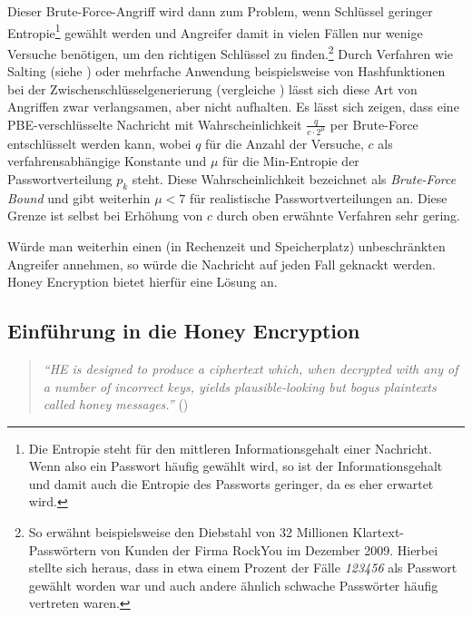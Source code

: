 Dieser Brute-Force-Angriff wird dann zum Problem, wenn Schlüssel geringer Entropie\footnote{Die Entropie steht für den mittleren Informationsgehalt einer Nachricht. Wenn also ein Passwort häufig gewählt wird, so ist der Informationsgehalt und damit auch die Entropie des Passworts geringer, da es eher erwartet wird.} gewählt werden und Angreifer damit in vielen Fällen nur wenige Versuche benötigen, um den richtigen Schlüssel zu finden.\footnote{So erwähnt \cite{IEEE2014} beispielsweise den Diebstahl von 32 Millionen Klartext-Passwörtern von Kunden der Firma RockYou im Dezember 2009. Hierbei stellte sich heraus, dass in etwa einem Prozent der Fälle \emph{123456} als Passwort gewählt worden war und auch andere ähnlich schwache Passwörter häufig vertreten waren.} Durch Verfahren wie Salting (siehe \cite{Schneier2006}) oder mehrfache Anwendung beispielsweise von Hashfunktionen bei der Zwischenschlüsselgenerierung (vergleiche \cite{pbkdf2000}) lässt sich diese Art von Angriffen zwar verlangsamen, aber nicht aufhalten. Es lässt sich zeigen, dass eine PBE-verschlüsselte Nachricht mit Wahrscheinlichkeit \(\frac{q}{c \cdot 2^{\mu}}\) per Brute-Force entschlüsselt werden kann, wobei \(q\) für die Anzahl der Versuche, \(c\) als verfahrensabhängige Konstante und \(\mu\) für die Min-Entropie der Passwortverteilung \(p_k\) steht. Diese Wahrscheinlichkeit bezeichnet \cite{EURO2014} als \textit{Brute-Force Bound} und gibt weiterhin \(\mu<7\) für realistische Passwortverteilungen an. Diese Grenze ist selbst bei Erhöhung von \(c\) durch oben erwähnte Verfahren sehr gering.

Würde man weiterhin einen (in Rechenzeit und Speicherplatz) unbeschränkten Angreifer annehmen, so würde die Nachricht auf jeden Fall geknackt werden. Honey Encryption bietet hierfür eine Lösung an.

\subsection{Einführung in die Honey Encryption}
\label{sec:funktionsweise-beispiel}

\begin{quote}
\textit{"`HE is designed to produce a ciphertext which, when decrypted with any of a number of
incorrect keys, yields plausible-looking but bogus plaintexts called honey messages."'} (\cite{EURO2014})
\end{quote}

